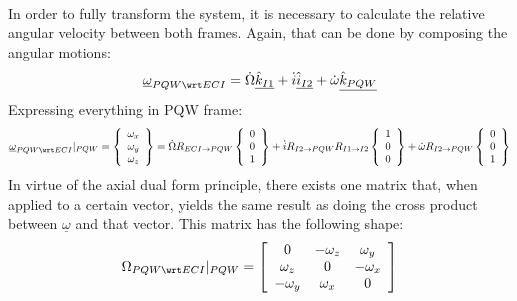 			\paragraph{ \\}
			\indent In order to fully transform the system, it is necessary to calculate the relative angular velocity between both frames. Again, that can be done by composing the angular motions:
			\[
			\underline{\omega}_{PQW \wrt ECI} = \dot{\Omega} \underline{\hat{k}_{I1}} + \dot{i} \underline{\hat{i}_{I2}} + \dot{\omega} \underline{\hat{k}_{PQW}}
			\]
			\indent Expressing everything in PQW frame:
			\[
			\underline{\omega}_{PQW \wrt ECI}\rvert_{PQW} = \left\{\begin{array}{c} \omega_x \\ \omega_y \\ \omega_z \end{array}\right\} = \dot{\Omega} R_{ECI\rightarrow PQW} \left\{\begin{array}{c} 0 \\ 0 \\ 1 \end{array}\right\} + \dot{i} R_{I2 \rightarrow PQW}R_{I1 \rightarrow I2} \left\{\begin{array}{c} 1 \\ 0 \\ 0 \end{array}\right\} + \dot{\omega} R_{I2 \rightarrow PQW} \left\{\begin{array}{c} 0 \\ 0 \\ 1 \end{array}\right\}
			\]
			\indent In virtue of the axial dual form principle, there exists one matrix that, when applied to a certain vector, yields the same result as doing the cross product between $\underline{\omega}$ and that vector. This matrix has the following shape:
			\[
			\Omega_{PQW \wrt ECI}\rvert_{PQW} = \left[ \begin{array}{ccc}
			0 			& -\omega_z & \omega_y \\
			\omega_z 	& 0 		& -\omega_x \\
			-\omega_y 	& \omega_x 	& 0
			\end{array}\right]
			\]
